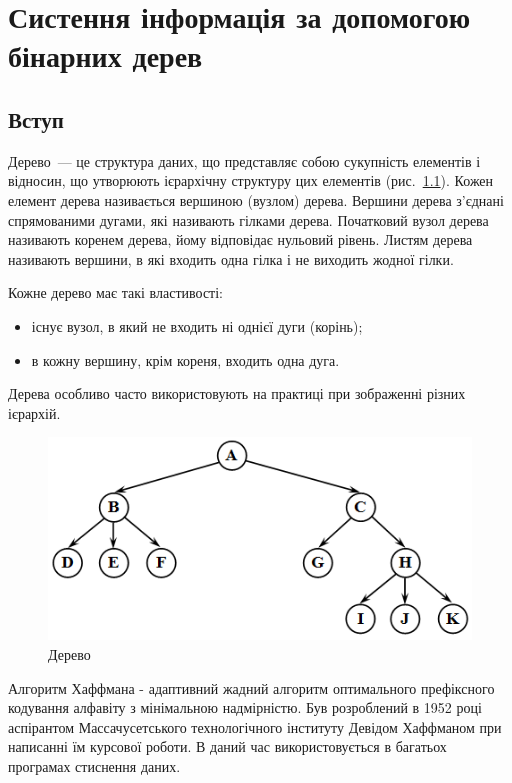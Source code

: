 \chapter{Систення інформація за допомогою бінарних дерев}

\nopagebreak[4]
\section{Вступ}
\nopagebreak[4]
Дерево~--- це структура даних, що представляє собою сукупність елементів і відносин, що утворюють ієрархічну структуру цих елементів (рис.~\ref{f:tree1}). Кожен елемент дерева називається вершиною (вузлом) дерева. Вершини дерева з'єднані спрямованими дугами, які називають гілками дерева. Початковий вузол дерева називають коренем дерева, йому відповідає нульовий рівень. Листям дерева називають вершини, в які входить одна гілка і не виходить жодної гілки.

Кожне дерево має такі властивості:
\begin{itemize}
\item існує вузол, в який не входить ні однієї дуги (корінь);
\item в кожну вершину, крім кореня, входить одна дуга.
\end{itemize}


Дерева особливо часто використовують на практиці при зображенні різних ієрархій.

\begin{figure}
\caption{Дерево}\label{f:tree1}
\includegraphics[width=13cm]{pic/31_01.png}

\end{figure}

Алгоритм Хаффмана - адаптивний жадний алгоритм оптимального префіксного кодування алфавіту з мінімальною надмірністю. Був розроблений в 1952 році аспірантом Массачусетського технологічного інституту Девідом Хаффманом при написанні їм курсової роботи. В даний час використовується в багатьох програмах стиснення даних.


